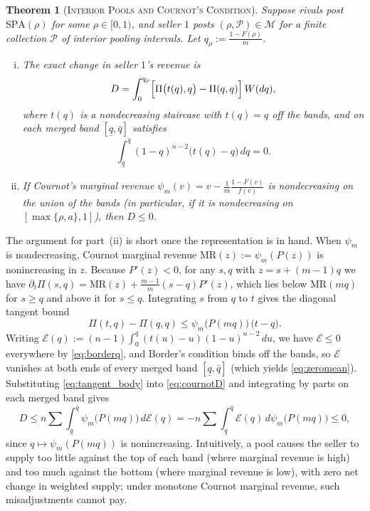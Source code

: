\documentclass[12pt]{article}
\theoremstyle{mystyle}
\newtheorem{theorem}{Theorem}
\theoremstyle{mystyle2}
\newcommand{\M}{\mathcal{M}}
\newcommand{\cP}{\mathcal{P}}
\newcommand{\SPA}{\mathrm{SPA}}
\newcommand{\1}{\mathbf{1}}
\begin{document}
\begin{theorem}[\textsc{Interior Pools and Cournot's Condition}]\label{thm:cournot}
Suppose rivals post $\SPA(\rho)$ for some $\rho\in[0,1)$, and seller $1$ posts $(\rho,\cP)\in\M$ for a finite collection $\cP$ of interior pooling intervals. Let $q_{\rho}:=\frac{1-F(\rho)}{m}$.
\begin{enumerate}[(i)]
\item The exact change in seller $1$'s revenue is
\begin{equation}\label{eq:cournotD}
D = \int_0^{q_{\rho}} \Bigl[\Pi\bigl(t(q),q\bigr) - \Pi(q,q)\Bigr]\,W(dq),
\end{equation}
where $t(q)$ is a nondecreasing staircase with $t(q)=q$ off the bands, and on each merged band $[\underline q,\bar q]$ satisfies
\begin{equation}\label{eq:zeromean}
\int_{\underline q}^{\bar q}(1-q)^{n-2}\bigl(t(q)-q\bigr)\,dq = 0.
\end{equation}
\item If Cournot's marginal revenue $\psi_m(v)=v-\frac{1}{m}\frac{1-F(v)}{f(v)}$ is nondecreasing on the union of the bands (in particular, if it is nondecreasing on $[\max\{\rho,a\},1]$), then $D\le 0$.
\end{enumerate}
\end{theorem}

The argument for part~(ii) is short once the representation is in hand. When $\psi_m$ is nondecreasing, Cournot marginal revenue $\mathrm{MR}(z):=\psi_m(P(z))$ is nonincreasing in $z$. Because $P'(z)<0$, for any $s,q$ with $z=s+(m-1)q$ we have $\partial_t\Pi(s,q)=\mathrm{MR}(z)+\frac{m-1}{m}(s-q)P'(z)$, which lies below $\mathrm{MR}(mq)$ for $s\ge q$ and above it for $s\le q$. Integrating $s$ from $q$ to $t$ gives the diagonal tangent bound
\begin{equation}\label{eq:tangent_body}
\Pi(t,q) - \Pi(q,q) \le \psi_m\bigl(P(mq)\bigr)\,\bigl(t - q\bigr).
\end{equation}
Writing $\mathcal E(q):=(n-1)\int_0^q (t(u)-u)(1-u)^{n-2}\,du$, we have $\mathcal E\le 0$ everywhere by \eqref{eq:borderq}, and Border's condition binds off the bands, so $\mathcal E$ vanishes at both ends of every merged band $[\underline q,\bar q]$ (which yields \eqref{eq:zeromean}). Substituting \eqref{eq:tangent_body} into \eqref{eq:cournotD} and integrating by parts on each merged band gives
\[
D \le n\sum \int_{\underline q}^{\bar q} \psi_m\bigl(P(mq)\bigr)\,d\mathcal E(q) = -n\sum \int_{\underline q}^{\bar q} \mathcal E(q)\,d\psi_m\bigl(P(mq)\bigr) \le 0,
\]
since $q\mapsto\psi_m(P(mq))$ is nonincreasing. Intuitively, a pool causes the seller to supply too little against the top of each band (where marginal revenue is high) and too much against the bottom (where marginal revenue is low), with zero net change in weighted supply; under monotone Cournot marginal revenue, such misadjustments cannot pay.
\end{document}
